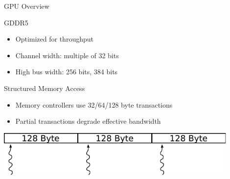 \begin{frame}{GPU Overview}

 \begin{block}{GDDR5}
   \begin{itemize}
    \item Optimized for throughput
    \item Channel width: multiple of 32 bits
    \item High bus width: 256 bits, 384 bits
   \end{itemize}
 \end{block}

 
 \begin{block}{Structured Memory Access}
   \begin{itemize}
    \item Memory controllers use 32/64/128 byte transactions
    \item Partial transactions degrade effective bandwidth
   \end{itemize}
 \end{block}

 \begin{center} \includegraphics[width=0.9\textwidth]{figures/memory-access-bad} \end{center}

\end{frame}






